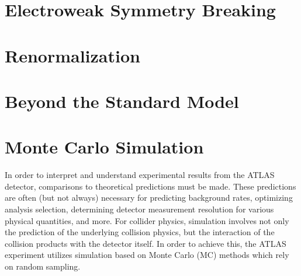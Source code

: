 % 
\section{Electroweak Symmetry Breaking}
\section{Renormalization}
\section{Beyond the Standard Model}

\section{Monte Carlo Simulation}
In order to interpret and understand experimental results from the ATLAS detector, comparisons to theoretical predictions must be made.
These predictions are often (but not always) necessary for predicting background rates, optimizing analysis selection, determining detector measurement resolution for various physical quantities, and more.
For collider physics, simulation involves not only the prediction of the underlying collision physics, but the interaction of the collision products with the detector itself.
In order to achieve this, the ATLAS experiment utilizes simulation based on Monte Carlo (MC) methods which rely on random sampling.


